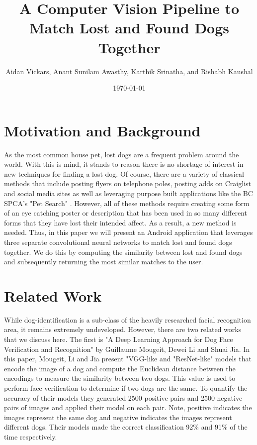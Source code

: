 \documentclass{article}
\title{A Computer Vision Pipeline to Match Lost and Found Dogs Together}
\author{Aidan Vickars, Anant Sunilam Awasthy, Karthik Srinatha, and Rishabh Kaushal}
\date{\today}
\begin{document}
\maketitle

\newpage

\tableofcontents

\newpage
\section{Motivation and Background}
As the most common house pet, lost dogs are a frequent problem around the world.  With this is mind, it stands to reason there is no shortage of interest in new techniques for finding a lost dog.  Of course, there are a variety of classical methods that include posting flyers on telephone poles, posting adds on Craiglist and social media sites as well as leveraging purpose built applications like the BC SPCA's "Pet Search" \cite{bcspcapetsearch}.  However, all of these methods require creating some form of an eye catching poster or description that has been used in so many different forms that they have lost their intended affect.  As a result, a new method is needed.  Thus, in this paper we will present an Android application that leverages three separate convolutional neural networks to match lost and found dogs together.  We do this by computing the similarity between lost and found dogs and subsequently returning the most similar matches to the user.

\section{Related Work}
	While dog-identification is a sub-class of the heavily researched facial recognition area, it remains extremely undeveloped.  However, there are two related works that we discuss here.  The first is "A Deep Learning Approach for Dog Face Verification and Recognition" \cite{MougeotGuillaume2019ADLA}  by  Guillaume Mougeit, Dewei Li and Shuai Jia.  In this paper, Mougeit, Li and Jia present "VGG-like and "ResNet-like" models that encode the image of a dog and compute the Euclidean distance between the encodings to measure the similarity between two dogs.  This value is used to perform face verification to determine if two dogs are the same.  To quantify the accuracy of their models they generated 2500 positive pairs and 2500 negative pairs of images and applied their model on each pair.  Note, positive indicates the images represent the same dog and negative indicates the images represent different dogs.  Their models made the correct classification 92\% and 91\% of the time respectively.
\end{document}
